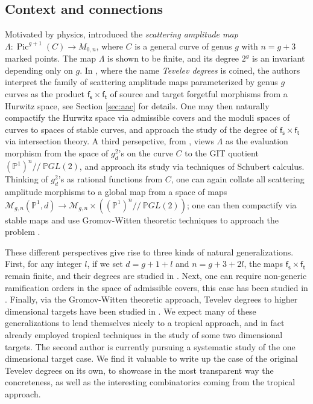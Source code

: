\documentclass[11pt,reqno]{amsart}
\theoremstyle{definition}
\newcommand{\bP}{\mathds{P}}
\newcommand{\calM}{\mathcal{M}}
\DeclareMathOperator{\Pic}{Pic}
\newcommand\Mgn[1]{\mathcal M_{#1}}
\newcommand{\ft}{\mathsf{f_t}}
\newcommand{\fs}{\mathsf{f_s}}
\begin{document}
\subsection{Context and connections}
Motivated by physics,  \cite{Tevelev:2020zux} introduced the {\it scattering amplitude map} $\Lambda: \Pic^{g+1}(C)\to M_{0,n}$, where $C$ is a general curve of genus $g$ with $n=g+3$ marked points. The map $\Lambda$ is shown to be finite, and its degree $2^g$ is an invariant depending only on $g$. In \cite{CPS:Tevdeg}, where the name {\it Tevelev degrees} is coined,  the authors interpret the family of  scattering amplitude maps parameterized by genus $g$ curves as the product $\fs\times \ft$ of source and target forgetful morphisms from a Hurwitz space, see Section \ref{sec:aac} for details. One may then naturally compactify the Hurwitz space via admissible covers and the  moduli spaces of curves to spaces of stable curves, and approach the study of the degree of $\fs\times \ft$ via intersection theory. A third persepctive, from \cite{A}, views $\Lambda$ as the evaluation morphism from the space of $g^2_d$'s on the curve $C$ to the GIT quotient $(\bP^1)^{n}//\ \bP GL(2)$, and approach its study via techniques of Schubert calculus. Thinking of $g^2_d$'s as rational functions from $C$, one can again collate all scattering amplitude morphisms to a global map from a space of maps $\calM_{g,n}(\bP^1,d)\to \Mgn{g,n}\times ((\bP^1)^{n}//\ \bP GL(2))$; one can then compactify via stable maps and use Gromov-Witten theoretic techniques to approach the problem \cite{B}.

These different perspectives give rise to three kinds of natural generalizations. First, for any integer $l$, if we set $d = g+1+l$ and $n = g+3+2l$, the maps $\fs\times\ft$ remain finite, and their degrees are studied in \cite{CPS:Tevdeg}. Next, one can require non-generic ramification orders in the space of admissible covers, this case has been studied in \cite{C}. Finally, via the Gromov-Witten theoretic approach, Tevelev degrees to higher dimensional targets have been studied in \cite{E,D}.
We expect many of these generalizations to lend themselves nicely to a tropical approach, and in fact \cite{D} already employed tropical techniques in the study of some two dimensional targets. The second author is currently pursuing a systematic study of the one dimensional target case. We find it valuable to write up the case of the original Tevelev degrees on its own, to showcase in the most transparent way the concreteness, as well as the interesting combinatorics coming from the tropical approach.
\end{document}
